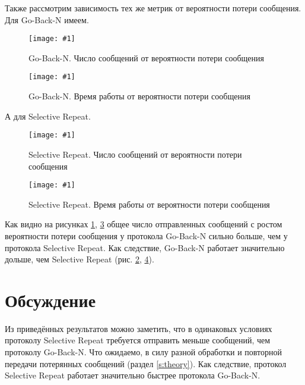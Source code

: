 \documentclass[a4paper,12pt]{article}
\newcommand{\plot}[3]{
    \begin{figure}[H]
        \begin{center}
            \texttt{[image: \#1]}
            \caption{#2}
            \label{#3}
        \end{center}
    \end{figure}
}
\begin{document}
    Также рассмотрим зависимость тех же метрик от вероятности потери сообщения.
    Для Go-Back-N имеем.

    \plot{sizeRateGBNMessageNum}{Go-Back-N. Число сообщений от вероятности потери сообщения}{p:sizeRateGBNMessageNum}
    \plot{sizeRateGBNWorkingTime}{Go-Back-N. Время работы от вероятности потери сообщения}{p:sizeRateGBNWorkingTime}

    А для Selective Repeat.
    
    \plot{sizeRateSRPMessageNum}{Selective Repeat. Число сообщений от вероятности потери сообщения}{p:sizeRateSRPMessageNum}
    \plot{sizeRateSRPWorkingTime}{Selective Repeat. Время работы от вероятности потери сообщения}{p:sizeRateSRPWorkingTime}

    Как видно на рисунках \ref{p:sizeRateGBNMessageNum}, \ref{p:sizeRateSRPMessageNum} общее число отправленных сообщений с ростом вероятности потери сообщения
    у протокола Go-Back-N сильно больше, чем у протокола Selective Repeat. Как следствие, Go-Back-N работает значительно дольше, чем Selective Repeat (рис. \ref{p:sizeRateGBNWorkingTime}, \ref{p:sizeRateSRPWorkingTime}). 

    \section{Обсуждение}
    \quad Из приведённых результатов можно заметить, что в одинаковых условиях протоколу Selective Repeat требуется отправить меньше сообщений, чем протоколу Go-Back-N.
    Что ожидаемо, в силу разной обработки и повторной передачи потерянных сообщений (раздел \ref{s:theory}).
    Как следствие, протокол Selective Repeat работает значительно быстрее протокола Go-Back-N.
\end{document}
